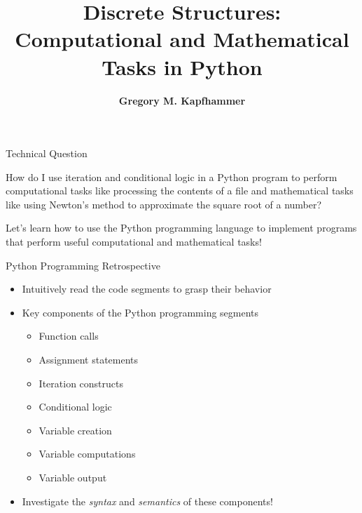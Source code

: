 \documentclass[14pt,aspectratio=169]{beamer}
\title{Discrete Structures: \\ Computational and Mathematical Tasks in Python}
\author{{\bf Gregory M. Kapfhammer}}
\institute[shortinst]{{\bf Department of Computer Science, Allegheny College}}
\begin{document}
{
  \begin{frame}
    \titlepage
  \end{frame}
}

%
\begin{frame}{Technical Question}
  \begin{center}
    {\large How do I use iteration and conditional logic in a Python program to
      perform computational tasks like processing the contents of a file and
      mathematical tasks like using Newton's method to approximate the square root
    of a number?}
  \end{center}
  \vspace{2ex}
  \begin{center}
    \small Let's learn how to use the Python programming language to implement
    programs that perform useful computational and mathematical tasks!
  \end{center}
\end{frame}

%
\begin{frame}{Python Programming Retrospective}
  \begin{itemize}
    \item Intuitively read the code segments to grasp their behavior
      \vspace*{-.15in}
    \item Key components of the Python programming segments
      \begin{itemize}
        \item Function calls
        \item Assignment statements
        \item Iteration constructs
        \item Conditional logic
        \item Variable creation
        \item Variable computations
        \item Variable output
      \end{itemize}
      \vspace*{-.2in}
    \item Investigate the {\em syntax} and {\em semantics} of these components!
  \end{itemize}
\end{frame}
\end{document}
